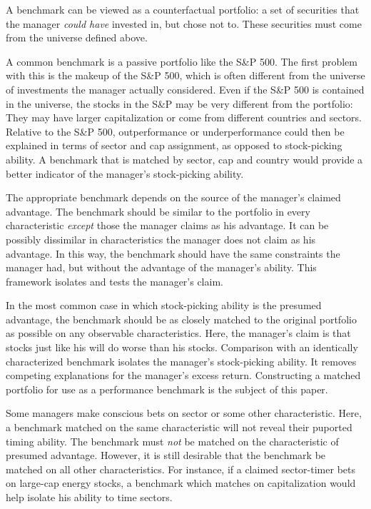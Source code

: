 \documentclass{article}\usepackage{graphicx, color}
\begin{document}
A benchmark can be viewed as a counterfactual portfolio: a set of
securities that the manager \emph{could have} invested in, but chose
not to. These securities must come from the universe defined above.

A common benchmark is a passive portfolio like the S\&P 500. The first problem
with this is the makeup of the S\&P 500, which is often different from
the universe of investments the manager actually considered. Even if
the S\&P 500 is contained in the universe, the stocks in the S\&P may
be very different from the portfolio: They may have larger
capitalization or come from different countries and sectors. Relative
to the S\&P 500, outperformance or underperformance could then be
explained in terms of sector and cap assignment, as opposed to
stock-picking ability. A benchmark that is matched by sector, cap and
country would provide a better indicator of the manager's
stock-picking ability.

The appropriate benchmark depends on the source of the manager's
claimed advantage. The benchmark should be similar to the portfolio in
every characteristic \emph{except} those the manager claims as his
advantage. It can be possibly dissimilar in characteristics the
manager does not claim as his advantage. In this way, the benchmark
should have the same constraints the manager had, but without the
advantage of the manager's ability. This framework isolates and
tests the manager's claim.

In the most common case in which stock-picking ability is the presumed
advantage, the benchmark should be as closely matched to the
original portfolio as possible on any observable
characteristics. Here, the manager's claim is that stocks just like his
will do worse than his stocks. Comparison with an identically
characterized benchmark isolates the manager's stock-picking
ability. It removes competing explanations for the manager's
excess return. Constructing a matched portfolio for use as a
performance benchmark is the subject of this paper.

Some managers make conscious bets on sector or some other
characteristic. Here, a benchmark matched on the same characteristic
will not reveal their puported timing ability. The benchmark must
\emph{not} be matched on the characteristic of presumed advantage. However,
it is still desirable that the benchmark be matched on all other
characteristics. For instance, if a claimed sector-timer bets on
large-cap energy stocks, a benchmark which matches on capitalization
would help isolate his ability to time sectors.
\end{document}
